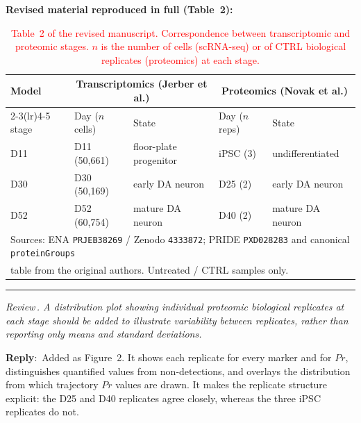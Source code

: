 \documentclass[11pt]{article}
\newcounter{reviewer}
\newcounter{point}[reviewer]
\renewcommand{\thepoint}{Review\,\thereviewer.\arabic{point}}
\newcommand{\point}[1]{\refstepcounter{point}  \bigskip \hrule \medskip \noindent \textit{{\fontseries{b}\selectfont \thepoint } #1}\par}
\newcommand{\reply}{\medskip \noindent \textbf{Reply}:\ }
\newcommand{\revisedheading}[1]{\medskip\noindent\textbf{Revised material
  reproduced in full (#1):}\par}
\begin{document}
\revisedheading{Table~2}
\begin{table}[!htbp]
\centering
\caption{\textcolor{red}{Table~2 of the revised manuscript. Correspondence between transcriptomic and proteomic stages. $n$ is the number of cells (scRNA-seq) or of CTRL biological replicates (proteomics) at each stage.}}
\color{red}
\begin{tabular}{lllll}
\toprule
Model & \multicolumn{2}{c}{Transcriptomics (Jerber et al.)} & \multicolumn{2}{c}{Proteomics (Novak et al.)} \\
\cmidrule(lr){2-3}\cmidrule(lr){4-5}
stage & Day ($n$ cells) & State & Day ($n$ reps) & State \\
\midrule
D11 & D11 (50,661) & floor-plate progenitor & iPSC (3) & undifferentiated \\
D30 & D30 (50,169) & early DA neuron        & D25 (2)  & early DA neuron \\
D52 & D52 (60,754) & mature DA neuron       & D40 (2)  & mature DA neuron \\
\bottomrule
\multicolumn{5}{l}{\footnotesize Sources: ENA \texttt{PRJEB38269} / Zenodo \texttt{4333872}; PRIDE \texttt{PXD028283} and canonical \texttt{proteinGroups}}\\
\multicolumn{5}{l}{\footnotesize table from the original authors. Untreated / CTRL samples only.}
\end{tabular}
\end{table}

\point{A distribution plot showing individual proteomic biological replicates at each stage should be added to illustrate variability between replicates, rather than reporting only means and standard deviations.}

\reply{Added as Figure~2. It shows each replicate for every marker and for $Pr$, distinguishes quantified values from non-detections, and overlays the distribution from which trajectory $Pr$ values are drawn. It makes the replicate structure explicit: the D25 and D40 replicates agree closely, whereas the three iPSC replicates do not.}
\end{document}
